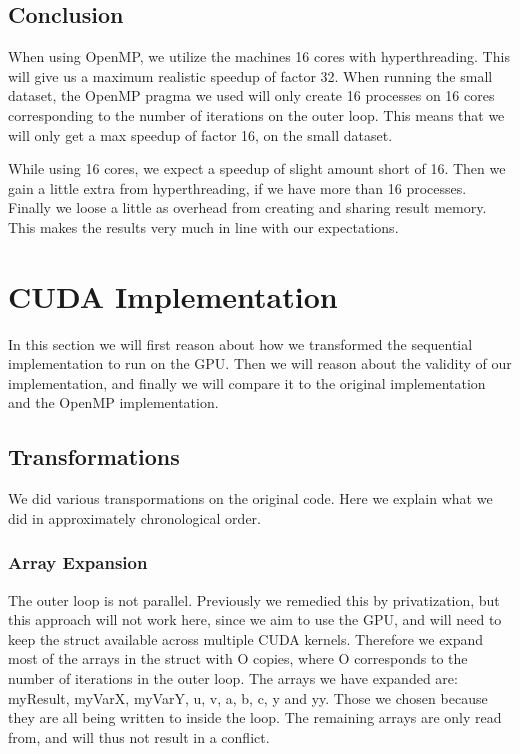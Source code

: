 \documentclass[11pt]{article}
\begin{document}
\subsection{Conclusion}
When using OpenMP, we utilize the machines 16 cores with hyperthreading. 
This will give us a maximum realistic speedup of factor 32. When running the small 
dataset, the OpenMP pragma we used will only create 16 processes on 16 cores
corresponding to the number of iterations on the outer loop. This means that 
we will only get a max speedup of factor 16, on the small dataset. 

While using 16 cores, we expect a speedup of slight amount short of 16. Then we 
gain a little extra from hyperthreading, if we have more than 16 processes. 
Finally we loose a little as overhead from creating and sharing result memory.
This makes the results very much in line with our expectations.


\section{CUDA Implementation}
In this section we will first reason about how we transformed the sequential
implementation to run on the GPU. Then we will reason about the validity of 
our implementation, and finally we will compare it to the original 
implementation and the OpenMP implementation.

\subsection{Transformations}
We did various transpormations on the original code. Here we explain what we 
did in approximately chronological order.

\subsubsection{Array Expansion}
The outer loop is not parallel. Previously we remedied this by privatization,
but this approach will not work here, since we aim to use the GPU, and will 
need to keep the struct available across multiple CUDA kernels. Therefore we
expand most of the arrays in the struct with O copies, where O corresponds to
the number of iterations in the outer loop. The arrays we have expanded are:
myResult, myVarX, myVarY, u, v, a, b, c, y and yy. Those we chosen because 
they are all being written to inside the loop. The remaining arrays are only 
read from, and will thus not result in a conflict. 
\end{document}

